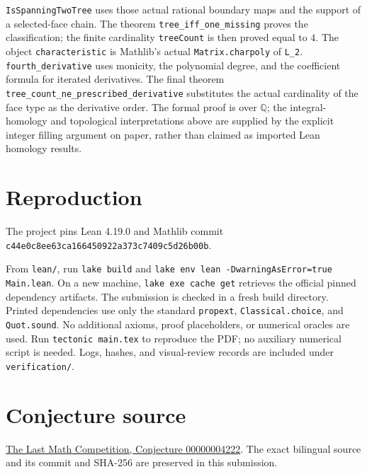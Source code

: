 \documentclass[11pt]{article}
\newcommand{\Q}{\mathbb Q}
\begin{document}
\texttt{IsSpanningTwoTree} uses those actual rational boundary maps and
the support of a selected-face chain. The theorem
\texttt{tree\_\allowbreak{}iff\_\allowbreak{}one\_\allowbreak{}missing} proves the classification; the finite
cardinality \texttt{treeCount} is then proved equal to $4$.
The object \texttt{characteristic} is Mathlib's actual
\texttt{Matrix.charpoly} of \texttt{L\_\allowbreak{}2}.
\texttt{fourth\_\allowbreak{}derivative} uses monicity, the polynomial degree, and
the coefficient formula for iterated derivatives. The final theorem
\texttt{tree\_\allowbreak{}count\_\allowbreak{}ne\_\allowbreak{}prescribed\_\allowbreak{}derivative} substitutes the actual
cardinality of the face type as the derivative order.
The formal proof is over $\Q$; the integral-homology and topological
interpretations above are supplied by the explicit integer filling
argument on paper, rather than claimed as imported Lean homology results.

\section*{Reproduction}
The project pins Lean 4.19.0 and Mathlib commit
\\\texttt{c44e0c8ee63ca166450922a373c7409c5d26b00b}.\par
From \texttt{lean/}, run \texttt{lake build} and
\texttt{lake env lean -DwarningAsError=true Main.lean}.
On a new machine, \texttt{lake exe cache get} retrieves the official
pinned dependency artifacts. The submission is checked in a fresh
build directory. Printed dependencies use only the standard
\texttt{propext}, \texttt{Classical.choice}, and \texttt{Quot.sound}.
No additional axioms, proof placeholders, or numerical oracles are used.
Run \texttt{tectonic main.tex} to reproduce the PDF; no auxiliary numerical
script is needed. Logs, hashes, and visual-review records are included
under \texttt{verification/}.

\section*{Conjecture source}
\href{https://github.com/The-Last-Math-Competition/The-Last-Math-Competition/blob/main/conjectures/00000004222.md}{The Last Math Competition, Conjecture 00000004222}.
The exact bilingual source and its commit and SHA-256 are preserved in
this submission.
\end{document}
